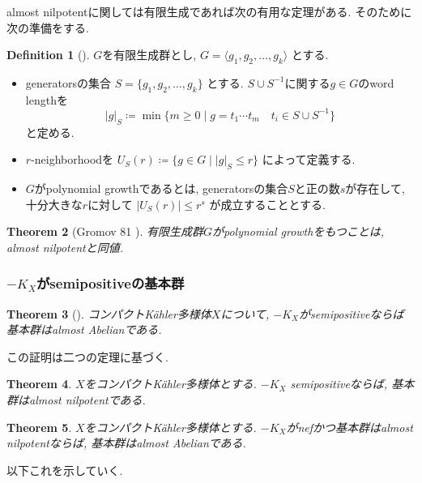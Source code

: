 \documentclass[dvipdfmx,a4paper,11pt]{article} %
\newtheorem{thm}{Theorem}[section]
\theoremstyle{definition}
\newtheorem{defn}[thm]{Definition}
\theoremstyle{remark}
\numberwithin{equation}{section}
\begin{document}
 almost nilpotentに関しては有限生成であれば次の有用な定理がある. 
 そのために次の準備をする. 
 
\begin{defn}[{\cite[Definition 3.9]{Zhu97}}]
$G$を有限生成群とし,
\(
G=\langle g_1,g_2,\ldots,g_k\rangle
\)
とする. 
\begin{itemize}
\item generatorsの集合
\(
S=\{g_1,g_2,\ldots,g_k\}
\)
とする. $S \cup S^{-1}$に関する$g \in G$のword lengthを
\[
\lvert g\rvert_{S}\coloneqq 
\min\{ m \geq 0 \mid g=t_1 \cdots t_m \quad t_i \in S \cup S^{-1} \}
\]
と定める. 
\item $r$-neighborhoodを
\(
U_{S}(r)
\coloneqq 
\{g\in G\mid \lvert g\rvert_{S} \leq r\}
\)
によって定義する.
\item $G$がpolynomial growthであるとは, generatorsの集合$S$と正の数$s$が存在して,十分大きな$r$に対して
\(
\lvert U_{S}(r)\rvert\leq r^s
\)
が成立することとする. 
\end{itemize}
\end{defn}
\begin{thm}[Gromov 81 {\cite[Theorem 3.10]{Zhu97}}]
\label{thm-Gromov-thm}
有限生成群$G$がpolynomial growthをもつことは, almost nilpotentと同値. 
\end{thm}

\subsubsection{ $-K_X$がsemipositiveの基本群}

\begin{thm}[{\cite{DPS96}}]
コンパクトK\"ahler多様体$X$について, $-K_X$がsemipositiveならば基本群はalmost Abelianである. 
\end{thm}
この証明は二つの定理に基づく. 
\begin{thm}
\label{thm-Milnor-thm}
$X$をコンパクトK\"ahler多様体とする. 
$-K_X$ semipositiveならば, 
基本群はalmost nilpotentである. 
\end{thm}

\begin{thm}
\label{thm-Campana-Special}
$X$をコンパクトK\"ahler多様体とする. 
$-K_X$がnefかつ基本群はalmost nilpotentならば, 
基本群はalmost Abelianである. 
\end{thm}

以下これを示していく. 
\end{document}
